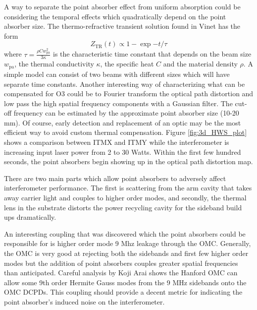 	A way to separate the point absorber effect from uniform absorption could be considering the temporal effects which quadratically depend on the point absorber size. The thermo-refractive transient solution found in Vinet \cite{Vinet_Thermal_Issues} has the form
	\begin{equation}\label{Thermal_Dist_time}
	Z_{\text{TR}}(t)   \propto 1-\exp{-t/ \tau}
	\end{equation}
	where $\tau = \frac{\rho C w_\text{pa}^2}{3 \kappa} $ is the characteristic time constant that depends on the beam size $w_\text{pa}$, the thermal conductivity $\kappa$, the specific heat $C$ and the material density $\rho$.  A simple model can consist of two beams with different sizes which will have separate time constants.  Another interesting way of characterizing what can be compensated for O3 could be to Fourier transform the optical path distortion and low pass the high spatial frequency components with a Gaussian filter. The cut-off frequency can be estimated by the approximate point absorber size (10-20 mm).  Of course, early detection and replacement of an optic may be the most efficient way to avoid custom thermal compensation.  Figure \ref{fig:3d_HWS_plot} shows a comparison between ITMX and ITMY while the interferometer is increasing input laser power from 2 to 30 Watts.  Within the first few hundred seconds, the point absorbers begin showing up in the optical path distortion map.
	
	There are two main parts which allow point absorbers to adversely affect interferometer performance.   The first is scattering from the arm cavity that takes away carrier light and couples to higher order modes, and secondly, the thermal lens in the substrate distorts the power recycling cavity for the sideband build ups dramatically.
	
	
	An interesting coupling that was discovered which the point absorbers could be responsible for is higher order mode 9 Mhz leakage through the OMC.  Generally, the OMC is very good at rejecting both the sidebands and first few higher order modes but the addition of point absorbers couples greater spatial frequencies than anticipated.  Careful analysis by Koji Arai \cite{9rin} shows the Hanford OMC can allow some 9th order Hermite Gauss modes from the 9 MHz sidebands onto the OMC DCPDs.  This coupling should provide a decent metric for indicating the point absorber's induced noise on the interferometer. 
	
